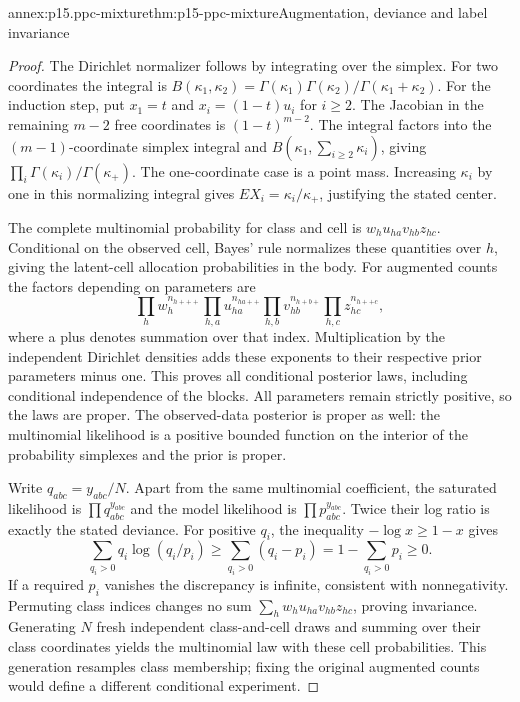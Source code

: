 \begin{annexitem}{annex:p15.ppc-mixture}{thm:p15-ppc-mixture}{Augmentation, deviance and label invariance}
\begin{proof}
The Dirichlet normalizer follows by integrating over the simplex.
For two coordinates the integral is
\(B(\kappa_1,\kappa_2)=\Gamma(\kappa_1)\Gamma(\kappa_2)/
\Gamma(\kappa_1+\kappa_2)\). For the induction step, put
\(x_1=t\) and \(x_i=(1-t)u_i\) for \(i\geq2\).
The Jacobian in the remaining \(m-2\) free coordinates is
\((1-t)^{m-2}\). The integral factors into the \((m-1)\)-coordinate
simplex integral and \(B(\kappa_1,\sum_{i\geq2}\kappa_i)\),
giving \(\prod_i\Gamma(\kappa_i)/\Gamma(\kappa_+)\).
The one-coordinate case is a point mass. Increasing \(\kappa_i\)
by one in this normalizing integral gives
\(E X_i=\kappa_i/\kappa_+\), justifying the stated center.

The complete multinomial probability for class and cell is
\(w_hu_{ha}v_{hb}z_{hc}\). Conditional on the observed cell, Bayes'
rule normalizes these quantities over \(h\), giving the latent-cell
allocation probabilities in the body. For augmented counts the factors
depending on parameters are
\[
 \prod_h w_h^{n_{h+++}}
 \prod_{h,a}u_{ha}^{n_{ha++}}
 \prod_{h,b}v_{hb}^{n_{h+b+}}
 \prod_{h,c}z_{hc}^{n_{h++c}},
\]
where a plus denotes summation over that index. Multiplication by the
independent Dirichlet densities adds these exponents to their respective
prior parameters minus one. This proves all conditional posterior laws,
including conditional independence of the blocks. All parameters remain
strictly positive, so the laws are proper. The observed-data posterior is
proper as well: the multinomial likelihood is a positive bounded function
on the interior of the probability simplexes and the prior is proper.

Write \(q_{abc}=y_{abc}/N\). Apart from the same multinomial coefficient,
the saturated likelihood is \(\prod q_{abc}^{y_{abc}}\) and the model
likelihood is \(\prod p_{abc}^{y_{abc}}\). Twice their log ratio is
exactly the stated deviance. For positive \(q_i\), the inequality
\(-\log x\geq1-x\) gives
\[
 \sum_{q_i>0}q_i\log(q_i/p_i)
 \geq\sum_{q_i>0}(q_i-p_i)
 =1-\sum_{q_i>0}p_i\geq0.
\]
If a required \(p_i\) vanishes the discrepancy is infinite, consistent
with nonnegativity. Permuting class indices changes no sum
\(\sum_h w_hu_{ha}v_{hb}z_{hc}\), proving invariance.
Generating \(N\) fresh independent class-and-cell draws and summing over
their class coordinates yields the multinomial law with these cell
probabilities. This generation resamples class membership; fixing the
original augmented counts would define a different conditional experiment.
\end{proof}
\end{annexitem}

